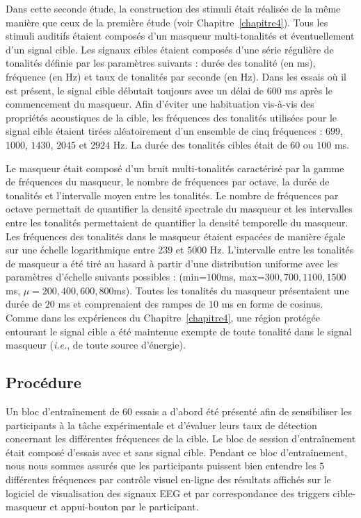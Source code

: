 Dans cette seconde étude, la construction des stimuli était réalisée de la même manière que ceux de la première étude (voir Chapitre~\ref{chapitre4}). 
Tous les stimuli auditifs étaient composés d'un masqueur multi-tonalités et éventuellement d'un signal cible. 
Les signaux cibles étaient composés d'une série régulière de tonalités définie par les paramètres suivants : durée des tonalité (en ms), fréquence (en Hz) et taux de tonalités par seconde (en Hz). 
Dans les essais où il est présent, le signal cible débutait toujours avec un délai de $600$ ms après le commencement du masqueur. 
Afin d'éviter une habituation vis-à-vis des propriétés acoustiques de la cible, les fréquences des tonalités utilisées pour le signal cible étaient tirées aléatoirement d'un ensemble de cinq fréquences : $699$, $1000$, $1430$, $2045$ et $2924$ Hz. 
La durée des tonalités cibles était de $60$ ou $100$ ms.

Le masqueur était composé d'un bruit multi-tonalités caractérisé par la gamme de fréquences du masqueur, le nombre de fréquences par octave, la durée de tonalités et l'intervalle moyen entre les tonalités. 
Le nombre de fréquences par octave permettait de quantifier la densité spectrale du masqueur et les intervalles entre les tonalités permettaient de quantifier la densité temporelle du masqueur. 
Les fréquences des tonalités dans le masqueur étaient espacées de manière égale sur une échelle logarithmique entre $239$ et $5000$ Hz. 
L'intervalle entre les tonalités de masqueur a été tiré au hasard à partir d'une distribution uniforme avec les paramètres d'échelle suivants possibles : (min=$100$ms, max=$300,700,1100,1500$ms, $\mu=200,400,600,800$ms). 
Toutes les tonalités du masqueur présentaient une durée de $20$ ms et comprenaient des rampes de $10$ ms en forme de cosinus. 
Comme dans les expériences du Chapitre~\ref{chapitre4}, une région protégée entourant le signal cible a été maintenue exempte de toute tonalité dans le signal masqueur (\textit{i.e.}, de toute source d'énergie). 

\subsection{Procédure}
\label{etude2procedure}

Un bloc d'entraînement de $60$ essais a d'abord été présenté afin de sensibiliser les participants à la tâche expérimentale et d'évaluer leurs taux de détection concernant les différentes fréquences de la cible. 
Le bloc de session d'entraînement était composé d'essais avec et sans signal cible. 
Pendant ce bloc d'entraînement, nous nous sommes assurés que les participants puissent bien entendre les $5$ différentes fréquences par contrôle visuel en-ligne des résultats affichés sur le logiciel de visualisation des signaux EEG et par correspondance des triggers cible-masqueur et appui-bouton par le participant. 

